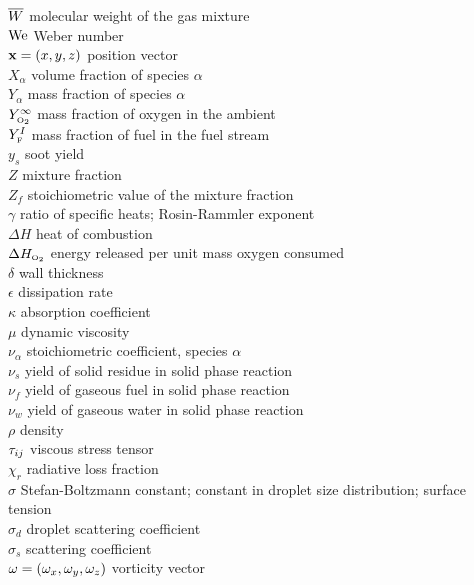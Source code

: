 \documentclass[11pt]{book}
\begin{document}
\begin{tabbing}
$\overline{W}$                     \> molecular weight of the gas mixture \\
$\hbox{We}$                     \> Weber number \\
${\bf x}=(x,y,z)$             \> position vector  \\
$X_\alpha$                \> volume fraction of species $\alpha$   \\
$Y_\alpha$                \> mass fraction of species $\alpha$   \\
$Y_{\tiny \hbox{O}_2}^\infty$          \> mass fraction of oxygen in the ambient   \\
$Y_{\tiny \hbox{F}}^I$                  \> mass fraction of fuel in the fuel stream   \\
$y_s$                     \> soot yield \\
$Z$                       \> mixture fraction   \\
$Z_f$                     \> stoichiometric value of the mixture fraction   \\
$\gamma$                  \> ratio of specific heats; Rosin-Rammler exponent \\
$\Delta H$                \> heat of combustion \\
$\Delta H_{\tiny \hbox{O}_2}$          \> energy released per unit mass oxygen consumed \\
$\delta$                  \> wall thickness \\
$\epsilon$                \> dissipation rate \\
$\kappa$                  \> absorption coefficient \\
$\mu$                     \> dynamic viscosity \\
$\nu_\alpha$              \> stoichiometric coefficient, species $\alpha$ \\
$\nu_s$           \> yield of solid residue in solid phase reaction \\
$\nu_f$           \> yield of gaseous fuel in solid phase reaction \\
$\nu_w$           \> yield of gaseous water in solid phase reaction \\
$\rho$                    \> density \\
${\bf \tau}_{ij}$              \> viscous stress tensor \\
$\chi_r$                  \> radiative loss fraction \\
$\sigma$                  \> Stefan-Boltzmann constant; constant in droplet size distribution; surface tension \\
$\sigma_d$                \> droplet scattering coefficient \\
$\sigma_s$                \> scattering coefficient \\
${\bf \omega}=(\omega_x,\omega_y,\omega_z)$    \> vorticity vector \\
\end{tabbing}
\end{document}
